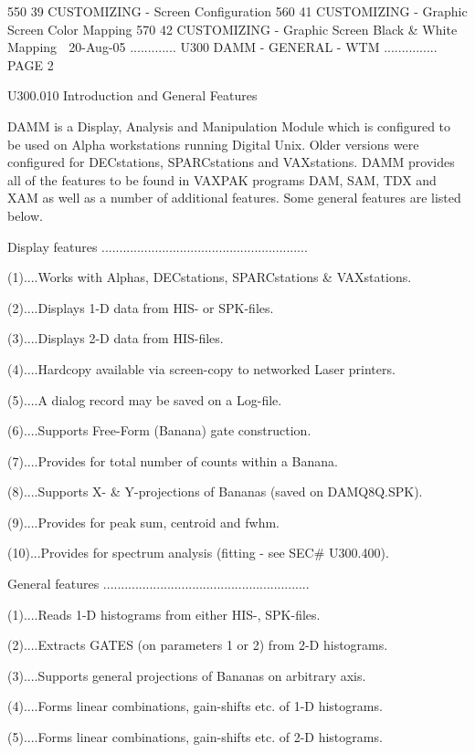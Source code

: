    550  39  CUSTOMIZING  - Screen Configuration
   560  41  CUSTOMIZING  - Graphic Screen Color Mapping
   570  42  CUSTOMIZING  - Graphic Screen Black & White Mapping
    
   20-Aug-05 ............. U300  DAMM - GENERAL - WTM ............... PAGE   2
 
   U300.010  Introduction and General Features
 
   DAMM  is a Display, Analysis and Manipulation Module which is configured to
   be used on Alpha workstations running Digital  Unix.  Older  versions  were
   configured  for  DECstations,  SPARCstations and VAXstations. DAMM provides
   all of the features to be found in VAXPAK programs DAM, SAM,  TDX  and  XAM
   as  well  as  a  number  of  additional features. Some general features are
   listed below.
 
   Display features ..........................................................
 
   (1)....Works with Alphas, DECstations, SPARCstations & VAXstations.
 
   (2)....Displays 1-D data from HIS- or SPK-files.
 
   (3)....Displays 2-D data from HIS-files.
 
   (4)....Hardcopy available via screen-copy to networked Laser printers.
 
   (5)....A dialog record may be saved on a Log-file.
 
   (6)....Supports Free-Form (Banana) gate construction.
 
   (7)....Provides for total number of counts within a Banana.
 
   (8)....Supports X- & Y-projections of Bananas (saved on DAMQ8Q.SPK).
 
   (9)....Provides for peak sum, centroid and fwhm.
 
   (10)...Provides for spectrum analysis (fitting - see SEC# U300.400).
 
 
   General features ..........................................................
 
   (1)....Reads 1-D histograms from either HIS-, SPK-files.
 
   (2)....Extracts GATES (on parameters 1 or 2) from 2-D histograms.
 
   (3)....Supports general projections of Bananas on arbitrary axis.
 
   (4)....Forms linear combinations, gain-shifts etc. of 1-D histograms.
 
   (5)....Forms linear combinations, gain-shifts etc. of 2-D histograms.
 
